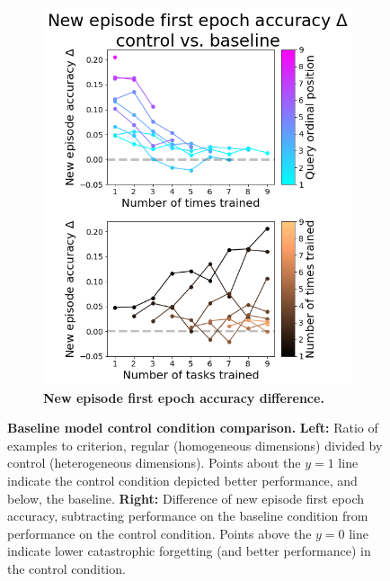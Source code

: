 \begin{figure}[!htb]
\begin{subfigure}{.49\textwidth}
    \includegraphics[width=\linewidth]{ch-results/figures/control_sequential/comparison_new_episode_accuracy.png}
    \caption{ {\bf New episode first epoch accuracy difference.}}
    \label{fig:results-control-sequential-comparison-new-episode-accuracy}
\end{subfigure}
\caption[Baseline model control condition comparison.]{{\bf Baseline model control condition comparison.} \textbf{Left:} Ratio of examples to criterion, regular (homogeneous dimensions) divided by control (heterogeneous dimensions). Points about the $y=1$ line indicate the control condition depicted better performance, and below, the baseline. \textbf{Right:} Difference of new episode first epoch accuracy, subtracting performance on the baseline condition from performance on the control condition. Points above the $y=0$ line indicate lower catastrophic forgetting (and better performance) in the control condition.}
\label{fig:results-control-comparison}
\vspace{-0.2in}
\end{figure}